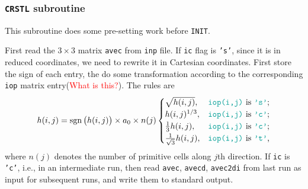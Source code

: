 
\subsubsection{\texttt{CRSTL} subroutine}

This subroutine does some pre-setting work before \texttt{INIT}.

First read the $3 \times 3$ matrix \texttt{avec} from \texttt{inp} file.
If \texttt{ic} flag is \texttt{'s'},
since it is in reduced coordinates, we need to rewrite it in Cartesian
coordinates. First store the sign of each entry, the do some transformation according to
the corresponding \texttt{iop} matrix entry(\textcolor{red}{What is this?}). The
rules are
\begin{equation}\label{eq:crstltrans}
 h(i, j) = \sign \big( h(i, j) \big) \times a_0 \times n(j)
 \begin{cases}
  \sqrt{h(i, j)},                 & \text{\texttt{iop(i,j)} is \texttt{'s'};} \\
  h(i, j)^{1/3},                  & \text{\texttt{iop(i,j)} is \texttt{'c'};} \\
  \frac{ 1 }{ 3 } h(i, j),        & \text{\texttt{iop(i,j)} is \texttt{'c'};} \\
  \frac{ 1 }{ \sqrt{3} } h(i, j), & \text{\texttt{iop(i,j)} is \texttt{'t'},}
 \end{cases}
\end{equation}
where $n(j)$ denotes the number of primitive cells along $j$th direction.
If \texttt{ic} is \texttt{'c'}, i.e., in an intermediate run,
then read \texttt{avec}, \texttt{avecd}, \texttt{avec2di} from last run as
input for subsequent runs, and write them to standard output.

